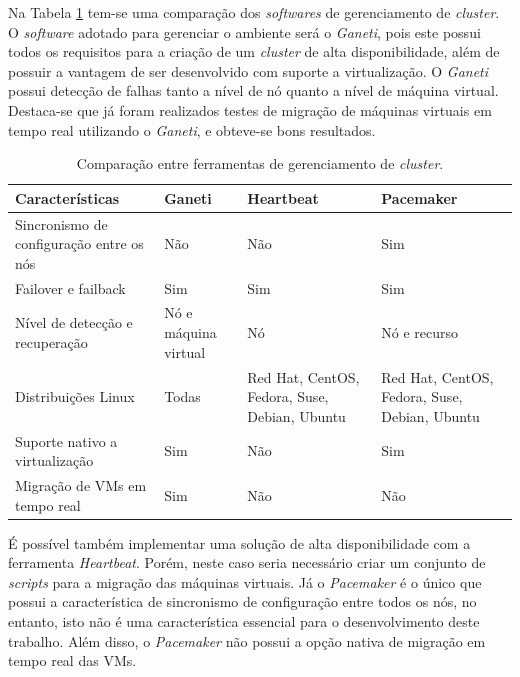 Na Tabela \ref{tab:clusterger} tem-se uma comparação dos \textit{softwares} de gerenciamento de \textit{cluster}. 
O \textit{software} adotado para gerenciar o ambiente será o \textit{Ganeti}, pois este possui todos os requisitos para a criação de um 
\textit{cluster} de alta disponibilidade, além de possuir a vantagem de ser desenvolvido com suporte a virtualização. O \textit{Ganeti} 
possui detecção de falhas tanto a nível de nó quanto a nível de máquina virtual. Destaca-se que já foram realizados testes de migração de 
máquinas virtuais em tempo real utilizando o \textit{Ganeti}, e obteve-se bons resultados.


\begin{table}[h!]
\caption{Comparação entre ferramentas de gerenciamento de \textit{cluster}.}
\label{tab:clusterger}
\begin{center}
\begin{tabular}{|p{4cm}|p{2cm}|p{3.5cm}|p{3.5cm}|}\hline
\textbf{Características} & \textbf{Ganeti} & \textbf{Heartbeat} & \textbf{Pacemaker} \\\hline
Sincronismo de configuração entre os nós & Não & Não & Sim \\\hline
Failover e failback & Sim & Sim & Sim \\\hline
Nível de detecção e recuperação & Nó e máquina virtual & Nó & Nó e recurso \\\hline
Distribuições Linux & Todas & Red Hat, CentOS, Fedora, Suse, Debian, Ubuntu & Red Hat, CentOS, Fedora, Suse, Debian, Ubuntu \\\hline
Suporte nativo a virtualização & Sim & Não & Sim \\\hline
Migração de \acp{VM} em tempo real & Sim & Não & Não \\\hline
\end{tabular}
\end{center}
\end{table}

É possível também implementar uma solução de alta disponibilidade com a ferramenta \textit{Heartbeat}. Porém, neste caso seria necessário criar 
um conjunto de \textit{scripts} para a migração das máquinas virtuais.
Já o \textit{Pacemaker} é o único que possui a característica de sincronismo de configuração entre todos os nós, no entanto, isto não é uma
característica essencial para o desenvolvimento deste trabalho. Além disso, o \textit{Pacemaker} não possui a opção nativa de migração em tempo
real das \acp{VM}.

